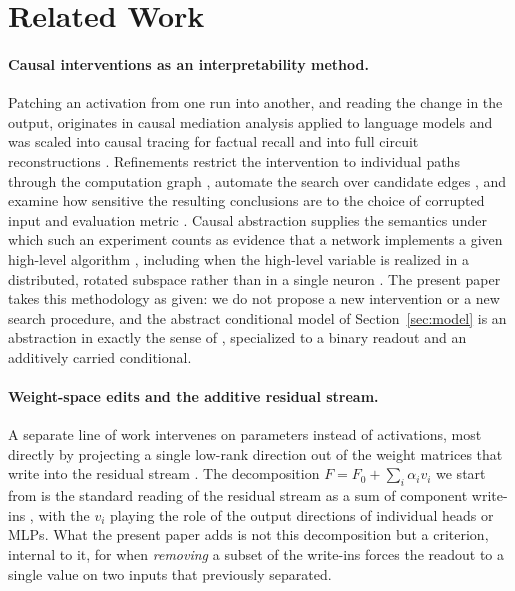 \documentclass[11pt,a4paper]{article}
\begin{document}
\section{Related Work}
\label{sec:related}

\paragraph{Causal interventions as an interpretability method.} Patching an
activation from one run into another, and reading the change in the output,
originates in causal mediation analysis applied to language models
\cite{vig2020} and was scaled into causal tracing for factual recall
\cite{meng2022} and into full circuit reconstructions
\cite{wang2023}. Refinements restrict the intervention to individual paths
through the computation graph \cite{goldowsky2023}, automate the search over
candidate edges \cite{conmy2023}, and examine how sensitive the resulting
conclusions are to the choice of corrupted input and evaluation metric
\cite{zhang2024}. Causal abstraction supplies the semantics under which such
an experiment counts as evidence that a network implements a given
high-level algorithm \cite{geiger2021}, including when the high-level
variable is realized in a distributed, rotated subspace rather than in a
single neuron \cite{geiger2024}. The present paper takes this methodology as
given: we do not propose a new intervention or a new search procedure, and
the abstract conditional model of Section~\ref{sec:model} is an
abstraction in exactly the sense of \cite{geiger2021}, specialized to a
binary readout and an additively carried conditional.

\paragraph{Weight-space edits and the additive residual stream.} A separate
line of work intervenes on parameters instead of activations, most directly
by projecting a single low-rank direction out of the weight matrices that
write into the residual stream \cite{arditi2024}. The decomposition
$F=F_0+\sum_i\alpha_i v_i$ we start from is the standard reading of the
residual stream as a sum of component write-ins \cite{elhage2021}, with the
$v_i$ playing the role of the output directions of individual heads or MLPs.
What the present paper adds is not this decomposition but a criterion,
internal to it, for when \emph{removing} a subset of the write-ins forces the
readout to a single value on two inputs that previously separated.
\end{document}
